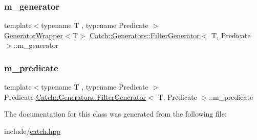 \subsubsection{\texorpdfstring{m\_generator}{m\_generator}}
{\footnotesize\ttfamily template$<$typename T , typename Predicate $>$ \\
\mbox{\hyperlink{class_catch_1_1_generators_1_1_generator_wrapper}{Generator\+Wrapper}}$<$T$>$ \mbox{\hyperlink{class_catch_1_1_generators_1_1_filter_generator}{Catch\+::\+Generators\+::\+Filter\+Generator}}$<$ T, Predicate $>$\+::m\+\_\+generator\hspace{0.3cm}{\ttfamily [private]}}

\mbox{\label{class_catch_1_1_generators_1_1_filter_generator_a51cda8aafad62eba1d26618f3ca8cff1}} 
\subsubsection{\texorpdfstring{m\_predicate}{m\_predicate}}
{\footnotesize\ttfamily template$<$typename T , typename Predicate $>$ \\
Predicate \mbox{\hyperlink{class_catch_1_1_generators_1_1_filter_generator}{Catch\+::\+Generators\+::\+Filter\+Generator}}$<$ T, Predicate $>$\+::m\+\_\+predicate\hspace{0.3cm}{\ttfamily [private]}}



The documentation for this class was generated from the following file\+:\begin{DoxyCompactItemize}
\item 
include/\mbox{\hyperlink{catch_8hpp}{catch.\+hpp}}\end{DoxyCompactItemize}
